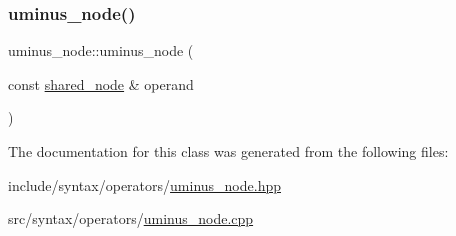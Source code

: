 \subsubsection{\texorpdfstring{uminus\+\_\+node()}{uminus\_node()}}
{\footnotesize\ttfamily uminus\+\_\+node\+::uminus\+\_\+node (\begin{DoxyParamCaption}\item[{const \hyperlink{namespacejawe_a3f307481d921b6cbb50cc8511fc2b544}{shared\+\_\+node} \&}]{operand }\end{DoxyParamCaption})}



The documentation for this class was generated from the following files\+:\begin{DoxyCompactItemize}
\item 
include/syntax/operators/\hyperlink{uminus__node_8hpp}{uminus\+\_\+node.\+hpp}\item 
src/syntax/operators/\hyperlink{uminus__node_8cpp}{uminus\+\_\+node.\+cpp}\end{DoxyCompactItemize}
